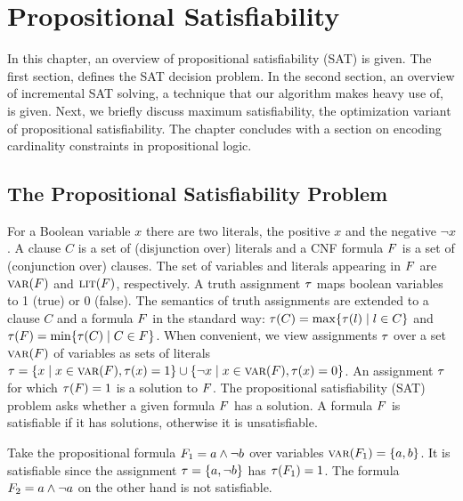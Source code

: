 \chapter{Propositional Satisfiability\label{chap:satisfiability}}

In this chapter, an overview of propositional satisfiability (SAT) is given.
The first section, defines the SAT decision problem.
In the second section, an overview of incremental SAT solving, a technique that our algorithm makes heavy use of, is given.
Next, we briefly discuss maximum satisfiability, the optimization variant of propositional satisfiability.
The chapter concludes with a section on encoding cardinality constraints in propositional logic.

\section{The Propositional Satisfiability Problem\label{sec:sat}}

For a Boolean variable $x$ there are two literals, the positive $x$ and the negative $\lnot x$. 
A clause $C$ is a set of (disjunction over) literals and a CNF formula $F$ is a set of (conjunction over) clauses.
The set of variables and literals appearing in $F$ are $\textsc{var}(F)$ and $\textsc{lit}(F)$, respectively.  
A truth assignment $\tau$ maps boolean variables to 1 (true) or 0 (false).
The semantics of truth assignments are extended to a clause $C$ and a formula $F$ in the standard way: $\tau(C) = \max\{ \tau(l) \mid l \in C\}$ and $\tau(F) = \min\{\tau(C) \mid C \in F\}$.
When convenient, we view assignments $\tau$ over a set $\textsc{var}(F)$ of variables as sets of literals $\tau = \{ x \mid x \in \textsc{var}(F),  \tau(x) = 1\} \cup \{ \lnot x \mid x \in \textsc{var}(F), \tau(x) = 0\}$.
An assignment $\tau$ for which $\tau(F) = 1$ is a solution to $F$.
The propositional satisfiability (SAT) problem asks whether a given formula $F$ has a solution.
A formula $F$ is satisfiable if it has solutions, otherwise it is unsatisfiable.

\begin{example}
  Take the propositional formula $F_1 = a \land \lnot b$ over variables $\textsc{var}(F_1) = \{a,b\}$.
  It is satisfiable since the assignment $\tau=\{a,\lnot b\}$ has $\tau(F_1)=1$.
  The formula $F_2 = a \land \lnot a$ on the other hand is not satisfiable.
\end{example}

